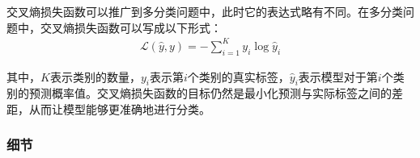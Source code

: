 \documentclass[letterpaper,12pt]{article}
\begin{document}
			交叉熵损失函数可以推广到多分类问题中，此时它的表达式略有不同。在多分类问题中，交叉熵损失函数可以写成以下形式： 
			\begin{equation}
				\begin{aligned}
					\mathcal{L}(\hat{y},y)=-\sum_{i=1}^K y_i \log \hat{y}_i
				\end{aligned}
				\label{eq: revised_Cross-entropy loss}
			\end{equation} 
			
			其中，$K$表示类别的数量，$y_i$表示第$i$个类别的真实标签，$\hat{y}_i$表示模型对于第$i$个类别的预测概率值。交叉熵损失函数的目标仍然是最小化预测与实际标签之间的差距，从而让模型能够更准确地进行分类。
	
	\subsubsection{细节}
	
	\renewcommand{\tablename}{Table}
	
	
\end{document}
